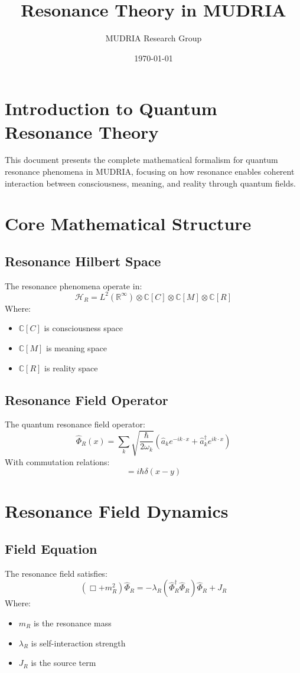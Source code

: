 \documentclass[12pt]{article}
\title{Resonance Theory in MUDRIA}
\author{MUDRIA Research Group}
\date{\today}
\begin{document}
\maketitle
\section{Introduction to Quantum Resonance Theory}
This document presents the complete mathematical formalism for quantum resonance phenomena in MUDRIA, focusing on how resonance enables coherent interaction between consciousness, meaning, and reality through quantum fields.
\section{Core Mathematical Structure}
\subsection{Resonance Hilbert Space}
The resonance phenomena operate in:
\begin{equation}
\mathcal{H}_R = L^2(\mathbb{R}^\infty) \otimes \mathbb{C}[C] \otimes \mathbb{C}[M] \otimes \mathbb{C}[R]
\end{equation}
Where:
\begin{itemize}
\item $\mathbb{C}[C]$ is consciousness space
\item $\mathbb{C}[M]$ is meaning space 
\item $\mathbb{C}[R]$ is reality space
\end{itemize}
\subsection{Resonance Field Operator}
The quantum resonance field operator:
\begin{equation}
\hat{\Phi}_R(x) = \sum_k \sqrt{\frac{\hbar}{2\omega_k}}(\hat{a}_k e^{-ik\cdot x} + \hat{a}_k^\dagger e^{ik\cdot x})
\end{equation}
With commutation relations:
\begin{equation}
[\hat{\Phi}_R(x),\hat{\Pi}_R(y)] = i\hbar\delta(x-y)
\end{equation}
\section{Resonance Field Dynamics}
\subsection{Field Equation}
The resonance field satisfies:
\begin{equation}
(\Box + m_R^2)\hat{\Phi}_R = -\lambda_R(\hat{\Phi}_R^\dagger\hat{\Phi}_R)\hat{\Phi}_R + J_R
\end{equation}
Where:
\begin{itemize}
\item $m_R$ is the resonance mass
\item $\lambda_R$ is self-interaction strength
\item $J_R$ is the source term
\end{itemize}
\end{document}
